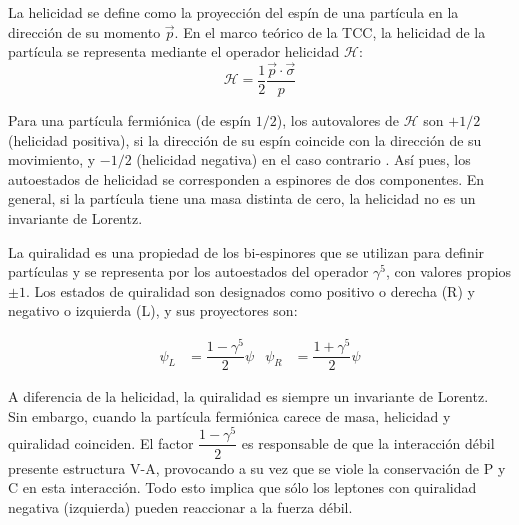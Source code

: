La helicidad se define como la proyección del espín de una partícula en la dirección de su momento $\vec{p}$. En el marco teórico de la TCC, la helicidad de la partícula se representa mediante el operador helicidad $\mathcal{H}$:
\begin{equation}
\mathcal{H}=\dfrac{1}{2} \dfrac{\vec{p} \cdot \vec{\sigma}}{p}
\end{equation} 

Para una partícula fermiónica (de espín $1/2$), los autovalores de $\mathcal{H}$ son $+1/2$ (helicidad positiva), si la dirección de su espín coincide con la dirección de su movimiento, y $-1/2$ (helicidad negativa) en el caso contrario \cite{Bettini}. Así pues, los autoestados de helicidad se corresponden a espinores de dos componentes. En general, si la partícula tiene una masa distinta de cero, la helicidad no es un invariante de Lorentz.

La quiralidad es una propiedad de los bi-espinores que se utilizan para definir partículas y se representa por los autoestados del operador $\gamma^5$, con valores propios $\pm 1$. Los estados de quiralidad son designados como positivo o derecha (R) y negativo o izquierda (L), y sus proyectores son:

\begin{align}
\psi_L &= \dfrac{1-\gamma^5}{2}\psi & \psi_R &= \dfrac{1+\gamma^5}{2}\psi
\end{align}

A diferencia de la helicidad, la quiralidad es siempre un invariante de Lorentz. Sin embargo, cuando la partícula fermiónica carece de masa, helicidad y quiralidad coinciden.
El factor $\dfrac{1-\gamma^5}{2}$ es responsable de que la interacción débil presente estructura V-A, provocando a su vez que se viole la conservación de P y C en esta interacción. Todo esto implica que sólo los leptones con quiralidad negativa (izquierda) pueden reaccionar a la fuerza débil.
